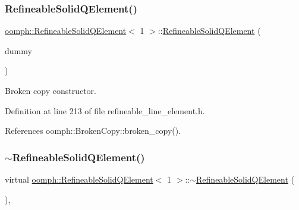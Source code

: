 \subsubsection{\texorpdfstring{Refineable\+Solid\+Q\+Element()}{RefineableSolidQElement()}\hspace{0.1cm}{\footnotesize\ttfamily [2/2]}}
{\footnotesize\ttfamily \hyperlink{classoomph_1_1RefineableSolidQElement}{oomph\+::\+Refineable\+Solid\+Q\+Element}$<$ 1 $>$\+::\hyperlink{classoomph_1_1RefineableSolidQElement}{Refineable\+Solid\+Q\+Element} (\begin{DoxyParamCaption}\item[{const \hyperlink{classoomph_1_1RefineableSolidQElement}{Refineable\+Solid\+Q\+Element}$<$ 1 $>$ \&}]{dummy }\end{DoxyParamCaption})\hspace{0.3cm}{\ttfamily [inline]}}



Broken copy constructor. 



Definition at line 213 of file refineable\+\_\+line\+\_\+element.\+h.



References oomph\+::\+Broken\+Copy\+::broken\+\_\+copy().

\mbox{\label{classoomph_1_1RefineableSolidQElement_3_011_01_4_ab930f7bef6bac1e6d6ac4a0e93bb8149}} 
\subsubsection{\texorpdfstring{$\sim$\+Refineable\+Solid\+Q\+Element()}{~RefineableSolidQElement()}}
{\footnotesize\ttfamily virtual \hyperlink{classoomph_1_1RefineableSolidQElement}{oomph\+::\+Refineable\+Solid\+Q\+Element}$<$ 1 $>$\+::$\sim$\hyperlink{classoomph_1_1RefineableSolidQElement}{Refineable\+Solid\+Q\+Element} (\begin{DoxyParamCaption}{ }\end{DoxyParamCaption})\hspace{0.3cm}{\ttfamily [inline]}, {\ttfamily [virtual]}}



